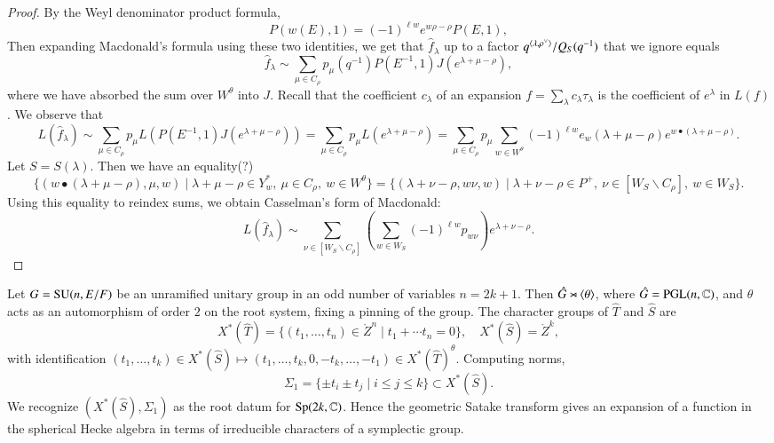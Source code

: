 \begin{proof}
By the Weyl denominator product formula,
\[
P(w(E),1) = (-1)^{\ell w} e^{w\rho - \rho} P(E,1),
\]
Then expanding Macdonald's formula using these two identities, we get
that $\hat f_\lambda$ up to a factor $q^{\langle{\lambda,\rho^\vee}\rangle}/Q_S(q^{-1})$ that we ignore equals
\[
\hat f_\lambda \sim \sum_{\mu\in C_\rho} p_\mu(q^{-1}) P(E^{-1},1) J (e^{\lambda+\mu - \rho}),
\]
where we have absorbed the sum over $W^\theta$ into $J$.
Recall that the coefficient $c_\lambda$ of an expansion $f = \sum_\lambda c_\lambda\tau_\lambda$ 
is the coefficient of $e^\lambda$ in $L(f)$.
We observe that %
\[
L(\hat f_\lambda) \sim \sum_{\mu\in C_\rho} p_\mu L(P(E^{-1},1) J(e^{\lambda+\mu-\rho})) = 
\sum_{\mu\in C_\rho} p_\mu L(e^{\lambda+\mu-\rho}) = 
\sum_{\mu\in C_\rho} p_\mu \sum_{w\in W^\theta} (-1)^{\ell w} e_w(\lambda+\mu-\rho) e^{w\bullet (\lambda+\mu-\rho)}.
\]
Let $S = S(\lambda)$.  Then we have an equality(?)
\[
\{(w\bullet (\lambda+\mu-\rho),\mu,w)\mid \lambda+\mu-\rho\in Y^*_w,\ \mu\in C_\rho,\ w\in W^\theta\} =
\{(\lambda+\nu-\rho,w\nu,w)\mid \lambda+\nu-\rho\in P^+,\ \nu\in [W_S\backslash C_\rho],\ w\in W_S\}.
\]
Using this equality to reindex sums, we obtain Casselman's form of Macdonald:
\[
L(\hat f_\lambda) \sim \sum_{\nu\in [W_S\backslash C_\rho]} \left(\sum_{w\in W_S} (-1)^{\ell w} p_{w\nu} \right) e^{\lambda+\nu-\rho}.
\]
\end{proof}

\begin{example}  Let $G={\operatorname{SU}}(n,E/F)$ be an unramified unitary group in an odd number of variables $n=2k+1$.
Then $\hat G\rtimes \langle{\theta}\rangle$, where $\hat G = {\operatorname{PGL}}(n,\mathbb{C})$, and $\theta$ acts as an automorphism
of order $2$ on the root system, fixing a pinning of the group.
The character groups of $\hat T$ and $\hat S$ are
\[
X^*(\hat T) = \{(t_1,\ldots,t_{n})\in \ring{Z}^n\mid t_1+\cdots t_n=0\}, 
\quad
X^*(\hat S)  = \ring{Z}^k,
\]
with identification $(t_1,\ldots,t_k)\in X^*(\hat S)\mapsto (t_1,\ldots,t_k,0,-t_k,\ldots,-t_1)\in X^*(\hat T)^\theta$.
Computing norms,
\[
\Sigma_1 = \{\pm t_i\pm t_j\mid i\le j\le k\}\subset X^*(\hat S).
\]
We recognize $(X^*(\hat S),\Sigma_1)$ as the root datum for ${\operatorname{Sp}}(2k,\mathbb{C})$.  Hence
the geometric Satake transform gives an expansion of a function in the spherical Hecke algebra
in terms of irreducible characters of a symplectic group.
\end{example}


